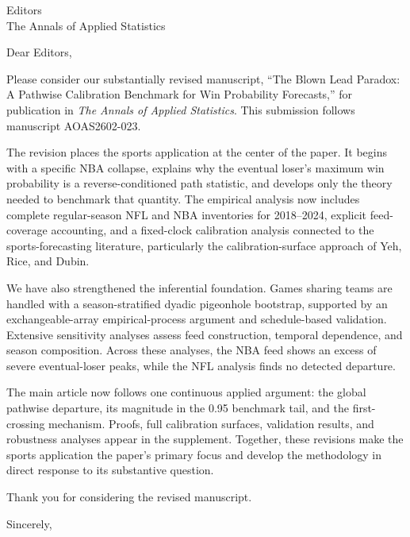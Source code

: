 \documentclass[11pt]{letter}
\date{August 25, 2026}
\begin{document}
\begin{letter}{Editors\\The Annals of Applied Statistics}

\opening{Dear Editors,}

Please consider our substantially revised manuscript, ``The Blown Lead Paradox: A Pathwise Calibration Benchmark for Win Probability Forecasts,'' for publication in \emph{The Annals of Applied Statistics}.  This submission follows manuscript AOAS2602-023.

The revision places the sports application at the center of the paper.  It begins with a specific NBA collapse, explains why the eventual loser's maximum win probability is a reverse-conditioned path statistic, and develops only the theory needed to benchmark that quantity.  The empirical analysis now includes complete regular-season NFL and NBA inventories for 2018--2024, explicit feed-coverage accounting, and a fixed-clock calibration analysis connected to the sports-forecasting literature, particularly the calibration-surface approach of Yeh, Rice, and Dubin.

We have also strengthened the inferential foundation.  Games sharing teams are handled with a season-stratified dyadic pigeonhole bootstrap, supported by an exchangeable-array empirical-process argument and schedule-based validation.  Extensive sensitivity analyses assess feed construction, temporal dependence, and season composition.  Across these analyses, the NBA feed shows an excess of severe eventual-loser peaks, while the NFL analysis finds no detected departure.

The main article now follows one continuous applied argument: the global pathwise departure, its magnitude in the 0.95 benchmark tail, and the first-crossing mechanism.  Proofs, full calibration surfaces, validation results, and robustness analyses appear in the supplement.  Together, these revisions make the sports application the paper's primary focus and develop the methodology in direct response to its substantive question.

Thank you for considering the revised manuscript.

\closing{Sincerely,}

\end{letter}
\end{document}

